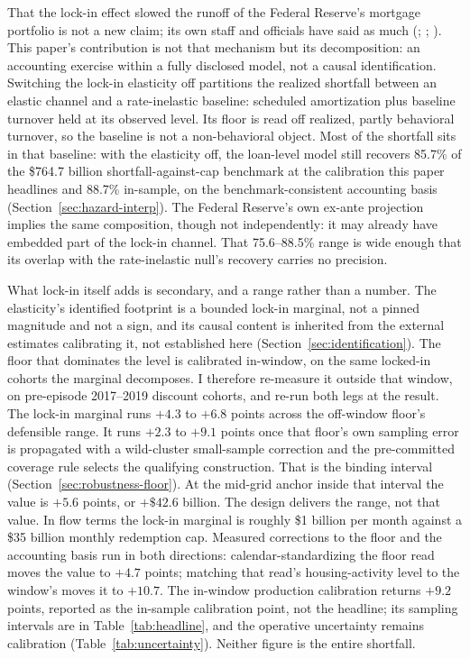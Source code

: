 That the lock-in effect slowed the runoff of the Federal Reserve's mortgage portfolio is not a new claim; its own staff and officials have said as much (\citealp{na2024}; \citealp{perli2024}; \citealp{hammack2025}). This paper's contribution is not that mechanism but its decomposition: an accounting exercise within a fully disclosed model, not a causal identification. Switching the lock-in elasticity off partitions the realized shortfall between an elastic channel and a rate-inelastic baseline: scheduled amortization plus baseline turnover held at its observed level. Its floor is read off realized, partly behavioral turnover, so the baseline is not a non-behavioral object. Most of the shortfall sits in that baseline: with the elasticity off, the loan-level model still recovers 85.7\% of the \$764.7 billion shortfall-against-cap benchmark at the calibration this paper headlines and 88.7\% in-sample, on the benchmark-consistent accounting basis (Section~\ref{sec:hazard-interp}). The Federal Reserve's own ex-ante projection implies the same composition, though not independently: it may already have embedded part of the lock-in channel. That 75.6--88.5\% range is wide enough that its overlap with the rate-inelastic null's recovery carries no precision.

What lock-in itself adds is secondary, and a range rather than a number. The elasticity's identified footprint is a bounded lock-in marginal, not a pinned magnitude and not a sign, and its causal content is inherited from the external estimates calibrating it, not established here (Section~\ref{sec:identification}). The floor that dominates the level is calibrated in-window, on the same locked-in cohorts the marginal decomposes. I therefore re-measure it outside that window, on pre-episode 2017--2019 discount cohorts, and re-run both legs at the result. The lock-in marginal runs $+4.3$ to $+6.8$ points across the off-window floor's defensible range. It runs $+2.3$ to $+9.1$ points once that floor's own sampling error is propagated with a wild-cluster small-sample correction and the pre-committed coverage rule selects the qualifying construction. That is the binding interval (Section~\ref{sec:robustness-floor}). At the mid-grid anchor inside that interval the value is $+5.6$ points, or $+\$42.6$ billion. The design delivers the range, not that value. In flow terms the lock-in marginal is roughly \$1 billion per month against a \$35 billion monthly redemption cap. Measured corrections to the floor and the accounting basis run in both directions: calendar-standardizing the floor read moves the value to $+4.7$ points; matching that read's housing-activity level to the window's moves it to $+10.7$. The in-window production calibration returns $+9.2$ points, reported as the in-sample calibration point, not the headline; its sampling intervals are in Table~\ref{tab:headline}, and the operative uncertainty remains calibration (Table~\ref{tab:uncertainty}). Neither figure is the entire shortfall.

